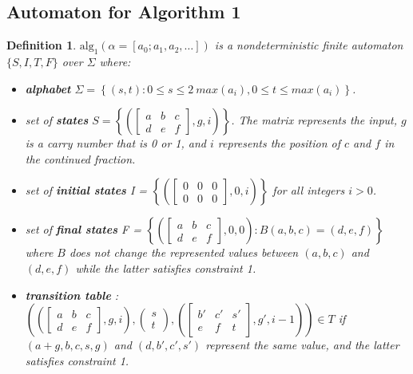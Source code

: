 \documentclass[a4paper]{article}
\newtheorem{definition}{Definition}
\begin{document}
\subsection{Automaton for Algorithm 1}

    \begin{definition}
    $\text{alg}_1(\alpha = [a_0; a_1,a_2,\dots])$ is a nondeterministic finite automaton $\{S,I,T,F\}$ over $\Sigma$ where:
    \begin{itemize}
    \item \textbf{alphabet} $\Sigma = \left\{(s,t) : 0\le s \le 2 ~max(a_i),0\le t \le max(a_i) \right\}$.
   \item set of \textbf{states} $S = \left\{\left(\begin{bmatrix}a&b&c\\d&e&f\end{bmatrix},g,i\right)\right\}$. The matrix represents the input, $g$ is a carry number that is 0 or 1, and $i$ represents the position of $c$ and $f$ in the continued fraction.
   \item set of \textbf{initial states} I = $\left\{\left(\begin{bmatrix}0&0&0\\0&0&0\end{bmatrix},0,i\right)\right\}$ for all integers $i> 0$.
   \item set of \textbf{final states} F = $\left\{\left(\begin{bmatrix}a&b&c\\d&e&f\end{bmatrix},0,0\right):B(a,b,c)=(d,e,f)\right\}$ where $B$ does not change the represented values between $(a,b,c)$ and $(d,e,f)$ while the latter satisfies constraint 1.
   \item \textbf{transition table} :  $\left(\left(\begin{bmatrix}a&b&c\\d&e&f\end{bmatrix},g,i\right), \begin{pmatrix}s\\t\end{pmatrix}, \left(\begin{bmatrix}b'&c'&s'\\e&f&t\end{bmatrix},g',i-1\right)  \right) \in T$ if $(a+g,b,c,s,g)$ and $(d,b',c',s')$ represent the same value, and the latter satisfies constraint 1.
   \end{itemize}
\end{definition}
\end{document}
